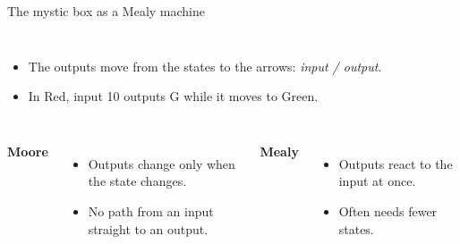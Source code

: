 \documentclass[10pt]{wosm-slides}
\begin{document}
\begin{frame}{The mystic box as a Mealy machine}
  \begin{columns}[c, totalwidth=\textwidth]
      \centering
      \begin{itemize}
        \item The outputs move from the states to the arrows:
          \emph{input / output}.
        \item In Red, input 10 outputs G while it moves to Green.
      \end{itemize}
  \end{columns}

  \bigskip
  \begin{columns}[T, totalwidth=\textwidth]
      \textbf{Moore}
      \begin{itemize}
        \item Outputs change only when the state changes.
        \item No path from an input straight to an output.
      \end{itemize}
      \textbf{Mealy}
      \begin{itemize}
        \item Outputs react to the input at once.
        \item Often needs fewer states.
      \end{itemize}
  \end{columns}
\end{frame}
\end{document}

